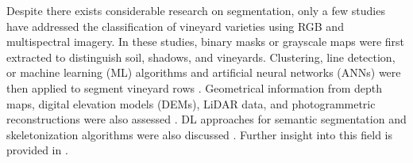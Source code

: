 Despite there exists considerable research on segmentation, only a few studies have addressed the classification of vineyard varieties using RGB and multispectral imagery. In these studies, binary masks or grayscale maps were first extracted to distinguish soil, shadows, and vineyards. Clustering, line detection, or machine learning (ML) algorithms and artificial neural networks (ANNs) were then applied to segment vineyard rows \cite{fuentes-penailillo_using_2018, karatzinis_towards_2020, hajjar_vine_2021, padua_monitoring_2020, padua_vineyard_2022, poblete-echeverria_detection_2017}. Geometrical information from depth maps, digital elevation models (DEMs), LiDAR data, and photogrammetric reconstructions were also assessed \cite{kerkech_vine_2020, aguiar_localization_2022, jurado_automatic_2020}. DL approaches for semantic segmentation and skeletonization algorithms were also discussed \cite{kerkech_vine_2020-1, barros_multispectral_2022, nolan_automated_2015}. Further insight into this field is provided in \cite{li_performance_2020}. 

